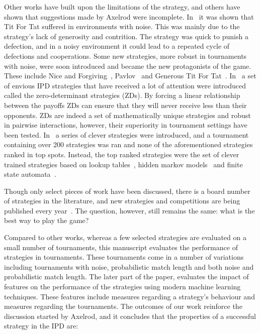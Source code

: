 \documentclass{article}
\newcommand{\numberofalltournaments}{}
\newcommand{\numberofstrategies}{}
\begin{document}
Other works have built upon the limitations of the strategy, and others have shown
that suggestions made by Axelrod were incomplete.
In~\cite{Bendor1991, Donninger1986, Molander1985, Hammerstein1984} it was shown
that Tit For Tat suffered in environments with noise. This was
mainly due to the strategy's lack of generosity and contrition. The strategy was
quick to punish a defection, and in a noisy environment it could lead to a
repeated cycle of defections and cooperations. Some new strategies, more
robust in tournaments with noise, were soon introduced and became the new
protagonists of the game. These include Nice and Forgiving~\cite{Bendor1991},
Pavlov~\cite{Nowak1993} and Generous Tit For Tat~\cite{Nowak1992}.
In~\cite{Press2012} a set of envious IPD strategies that have received a lot of
attention were introduced called the zero-determinant strategies (ZDs). By
forcing a linear relationship between the payoffs ZDs can ensure that they will
never receive less than their opponents. ZDs are indeed a set of mathematically
unique strategies and robust in pairwise interactions, however, their
superiority in tournament settings have been tested. In~\cite{Harper2017} a
series of clever strategies were introduced, and a tournament containing over
200 strategies was ran and none of the aforementioned strategies ranked in top
spots. Instead, the top ranked strategies were the set of clever trained
strategies based on lookup tables~\cite{Axelrod1987}, hidden markov
models~\cite{Harper2017} and finite state automata~\cite{Miller1996}.

Though only select pieces of work have been discussed, there is a board number
of strategies in the literature, and new strategies and competitions are being
published every year~\cite{Glynatsi2019}. The question, however, still remains
the same: what is the best way to play the game?

Compared to other works, whereas a few selected strategies are evaluated
on a small number of tournaments, this manuscript evaluates the performance of \numberofstrategies
strategies in \numberofalltournaments tournaments. These tournaments come in a
number of variations including tournaments with noise, probabilistic match
length and both noise and probabilistic match length.
The later part of the paper, evaluates
the impact of features on the performance of the strategies using modern
machine learning techniques. These features include measures regarding a
strategy's behaviour and measures regarding the tournaments. The outcomes of our
work reinforce the discussion started by Axelrod, and it concludes that the properties
of a successful strategy in the IPD are:
\end{document}
